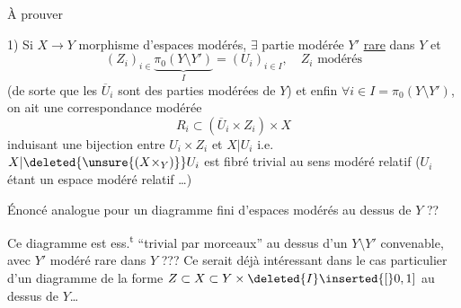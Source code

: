 À prouver

1) Si $X\to Y$ morphisme d'espaces modérés, $\exists$ partie modérée $Y'$ \uline{rare} dans $Y$ et
\[
(Z_i)_{i\in}\underbrace{\pi_0(Y\setminus Y')}_{I}=(U_i)_{i\in I},\quad Z_i\text{ modérés}
\]
(de sorte que les $\overline U_i$ sont des parties modérées de $Y$) et enfin $\forall i\in I=\pi_0(Y\setminus Y')$, on ait une correspondance modérée
\[
R_i\subset(\overline U_i\times Z_i)\times X
\]
induisant une bijection entre $U_i\times Z_i$ et $X|U_i$ i.e. $X|\deleted{\unsure{(X\times_Y)}}U_i$ est fibré  trivial au sens modéré relatif ($U_i$ étant un espace modéré relatif \ldots)

Énoncé analogue pour un diagramme fini d'espaces modérés au dessus de $Y$ ??

Ce diagramme est ess.\textsuperscript{t} ``trivial par morceaux'' au dessus d'un $Y\setminus Y'$ convenable, avec $Y'$ modéré rare dans $Y$ ??? Ce serait déjà intéressant dans le cas particulier d'un diagramme de la forme $Z\subset X\subset Y\times\deleted{I}\inserted{[}0,1]$ \deleted{$\unsure{(I\subset[0,}$} au dessus de $Y$\ldots

